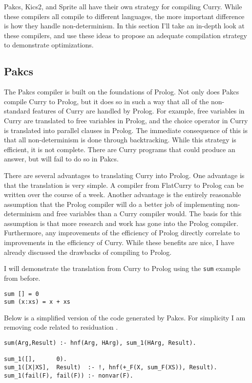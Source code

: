 
Pakcs, Kics2, and Sprite all have their own strategy for compiling Curry.
While these compilers all compile to different languages,
the more important difference is how they handle non-determinism.
In this section I'll take an in-depth look at these compilers,
and use these ideas to propose an adequate compilation strategy
to demonstrate optimizations.

\subsection{Pakcs}

The Pakcs compiler is built on the foundations of Prolog.
Not only does Pakcs compile Curry to Prolog,
but it does so in such a way that all of the non-standard features 
of Curry are handled by Prolog.
For example, free variables in Curry are translated to free variables in Prolog,
and the choice operator in Curry is translated into parallel clauses in Prolog.
The immediate consequence of this is that all non-determinism is done through backtracking.
While this strategy is efficient, it is not complete.
There are Curry programs that could produce an answer, but will fail to do so in Pakcs.

There are several advantages to translating Curry into Prolog.
One advantage is that the translation is very simple.
A compiler from FlatCurry to Prolog can be written over the course of a week.
Another advantage is the entirely reasonable assumption that the Prolog compiler
will do a better job of implementing non-determinism and free variables than a Curry compiler would.
The basis for this assumption is that more research and work has gone into the Prolog compiler.
Furthermore, any improvements of the efficiency of Prolog directly correlate to improvements
in the efficiency of Curry.
While these benefits are nice, I have already discussed the drawbacks of compiling to Prolog.

I will demonstrate the translation from Curry to Prolog using the \texttt{sum} example from before.

\begin{verbatim}
sum [] = 0
sum (x:xs) = x + xs
\end{verbatim}

Below is a simplified version of the code generated by Pakcs.
For simplicity I am removing code related to residuation \cite{Hanus17PAKCS}.

\begin{verbatim}
sum(Arg,Result) :- hnf(Arg, HArg), sum_1(HArg, Result).

sum_1([],      0).
sum_1([X|XS],  Result)  :- !, hnf(+_F(X, sum_F(XS)), Result).
sum_1(fail(F), fail(F)) :- nonvar(F).
\end{verbatim}

